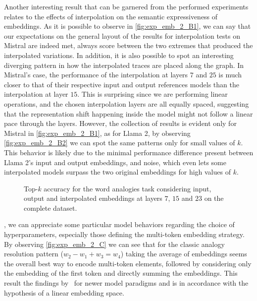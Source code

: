 Another interesting result that can be garnered from the performed experiments relates to the effects of interpolation on the semantic expressiveness of embeddings.
As it is possible to observe in \cref{fig:exp_emb_2_B1}, we can say that our expectations on the general layout of the results for interpolation tests on Mistral are indeed met,  always score between the two extremes that produced the interpolated variations.
In addition, it is also possible to spot an interesting diverging pattern in how the interpolated traces are placed along the graph.
In Mistral's case, the performance of the interpolation at layers $7$ and $25$ is much closer to that of their respective input and output references models than the interpolation at layer $15$.
This is surprising since we are performing linear operations, and the chosen interpolation layers are all equally spaced, suggesting that the representation shift happening inside the model might not follow a linear pace through the layers.
However, the  collection of results is evident only for Mistral in \cref{fig:exp_emb_2_B1}, as for Llama 2, by observing \cref{fig:exp_emb_2_B2} we can spot the same patterns only for small values of $k$.
This behavior is likely due to the minimal performance difference present between Llama 2's input and output embeddings, and noise, which even lets some interpolated models surpass the two original embeddings for high values of $k$.

\begin{figure}[t!]
    \centering
    \caption{Top-$k$ accuracy for the word analogies task considering input, output and interpolated embeddings at layers $7$, $15$ and $23$ on the complete dataset.}
    \label{fig:exp_emb_2_B}
\end{figure}

, we can appreciate some particular model behaviors regarding the choice of hyperparameters, especially those defining the multi-token embedding strategy.
By observing \cref{fig:exp_emb_2_C} we can see that for the classic analogy resolution pattern ($w_2 - w_1 + w_3 = w_4$) taking the average of embeddings seems the overall best way to encode multi-token elements, followed by considering only the embedding of the first token and directly summing the embeddings.
This result  the findings  by~\citet{drozd2016} for newer model paradigms and is in accordance with the hypothesis of a linear embedding space.

